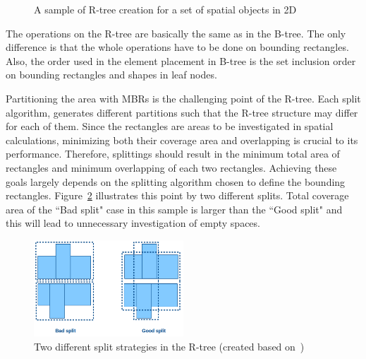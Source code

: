 \documentclass[a4paper,12pt]{article}
\begin{document}
\begin{figure}
\centering
{}
\centering
{}
\caption{A sample of R-tree creation for a set of spatial objects in 2D}
\label{rtree}
\end{figure}

The operations on the R-tree are basically the same as in the B-tree. The only difference is that the 
whole operations have to be done on bounding rectangles.
Also, the order used in the element placement in B-tree
is the set inclusion order on bounding rectangles and shapes in leaf nodes. 

Partitioning the area with MBRs is the challenging point of the R-tree. Each split algorithm, generates different partitions such that the R-tree structure may differ for each of them. Since the rectangles are areas to be investigated in spatial calculations, minimizing both their coverage area and overlapping is crucial to its performance. Therefore, splittings should result in the minimum total area of rectangles and minimum overlapping of each two rectangles. 
Achieving these goals largely depends on the splitting algorithm chosen to define the bounding rectangles. Figure~\ref{rtreesplit} illustrates this point by two different splits. Total coverage area of the ``Bad split" case in this sample is larger than the ``Good split" and this will lead to unnecessary investigation of empty spaces.

\begin{figure}
\centering
\includegraphics[width=0.5\textwidth,height=0.17\textheight]{R-treeMBR}
\caption{Two different split strategies in the R-tree (created based on~\cite{rtree})}
\label{rtreesplit}
\end{figure}
\end{document}
